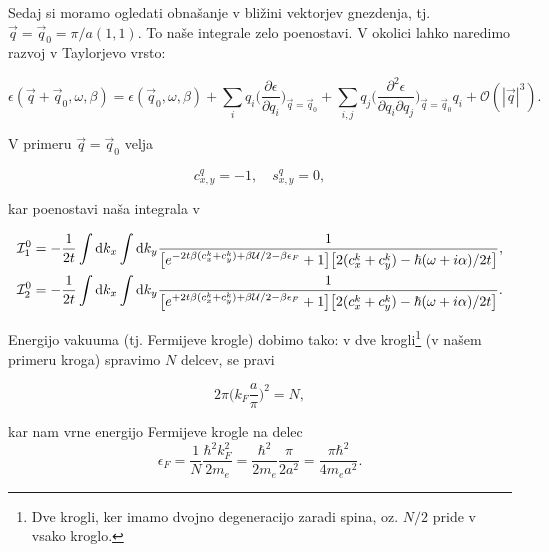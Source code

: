 \documentclass[a4paper, 12pt]{article}
\newcommand{\vq}{
	\ensuremath{\vec{q}}
}
\newcommand{\w}{
	\ensuremath{\omega}
}
\newcommand{\e}{
	\ensuremath{\epsilon}
}
\renewcommand{\ni}{
	\noindent
}
\newcommand{\dd}{
	\ensuremath{\text{d}}
}
\newcommand{\I}{
	\ensuremath{\mathcal{I}}
}
\begin{document}
Sedaj si moramo ogledati obna\v sanje v bli\v zini vektorjev gnezdenja, tj. $\vq = \vq_0 =
\pi/a (1,1)$. To na\v se integrale zelo poenostavi. V okolici lahko naredimo razvoj v Taylorjevo
vrsto:

\begin{equation}
	\e (\vq + \vq_0, \w, \beta) = \e (\vq_0, \w, \beta) + \sum_i q_i \bigg(\frac{\partial\e}
		{\partial q_i}\bigg)_{\vq = \vq_0}
		+ \sum_{i,j} q_j \bigg(\frac{\partial^2 \e}{\partial q_i
		\partial q_j}\bigg)_{\vq = \vq_0} q_i + \mathcal{O}(|\vq|^3).
\end{equation}

\ni V primeru $\vq = \vq_0$ velja

\begin{equation}
	c_{x,y}^q = -1, \quad s_{x,y}^q = 0,
\end{equation}

\ni kar poenostavi na\v sa integrala v

\begin{align}
	\I_1^0 &= -\frac{1}{2t}\int \dd k_x\int \dd k_y \frac{1}
		{\big[e^{-2t\beta(c_x^k + c_y^k) + \beta\mathcal{U}/2 - \beta\e_F} + 1\big]\big[
		2(c_x^k + c_y^k) - \hbar(\w + i\alpha)/2t\big]}, \notag \\
	\I_2^0 &= -\frac{1}{2t}\int \dd k_x\int \dd k_y \frac{1}
	{\big[e^{+2t\beta(c_x^k + c_y^k) + \beta\mathcal{U}/2 - \beta\e_F} + 1\big]\big[
		2(c_x^k + c_y^k) - \hbar(\w + i\alpha)/2t\big]}.
\end{align}

\ni Energijo vakuuma (tj. Fermijeve krogle) dobimo tako: v dve krogli\footnote{Dve krogli, ker imamo
dvojno degeneracijo zaradi spina, oz. $N/2$ pride v vsako kroglo.} (v na\v sem primeru kroga) spravimo
$N$ delcev, se pravi

\begin{equation}
	2\pi \Big(k_F \frac{a}{\pi}\Big)^2 = N,
\end{equation}

\ni kar nam vrne energijo Fermijeve krogle na delec
\begin{equation}
	\e_F = \frac{1}{N}\frac{\hbar^2 k_F^2}{2 m_e} = \frac{\hbar^2}{2 m_e} \frac{\pi}{2a^2} =
		\frac{\pi\hbar^2}{4 m_e a^2}.
\end{equation}
\end{document}
